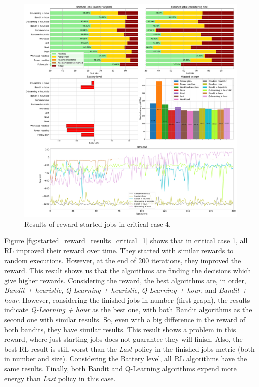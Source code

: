 \begin{figure}[!htb]
    \centering
    \includegraphics[scale=0.29]{Images/Learning_compensations/reward_started_profile_worst_workload_2_with_noise_state_delta.pdf}
    \caption{Results of reward started jobs in critical case 4.}
    \label{fig:started_reward_results_critical_4}
\end{figure}

Figure \ref{fig:started_reward_results_critical_1} shows that in critical case 1, all RL improved their reward over time. They started with similar rewards to random executions. However, at the end of 200 iterations, they improved the reward. This result shows us that the algorithms are finding the decisions which give higher rewards. Considering the reward, the best algorithms are, in order, \emph{Bandit + heuristic}, \emph{Q-Learning + heuristic}, \emph{Q-Learning + hour}, and \emph{Bandit + hour}. However, considering the finished jobs in number (first graph), the results indicate \emph{Q-Learning + hour} as the best one, with both Bandit algorithms as the second one with similar results. So, even with a big difference in the reward of both bandits, they have similar results. This result shows a problem in this reward, where just starting jobs does not guarantee they will finish. Also, the best RL result is still worst than the \emph{Last} policy in the finished jobs metric (both in number and size). Considering the Battery level, all RL algorithms have the same results. Finally, both Bandit and Q-Learning algorithms expend more energy than \emph{Last} policy in this case.

